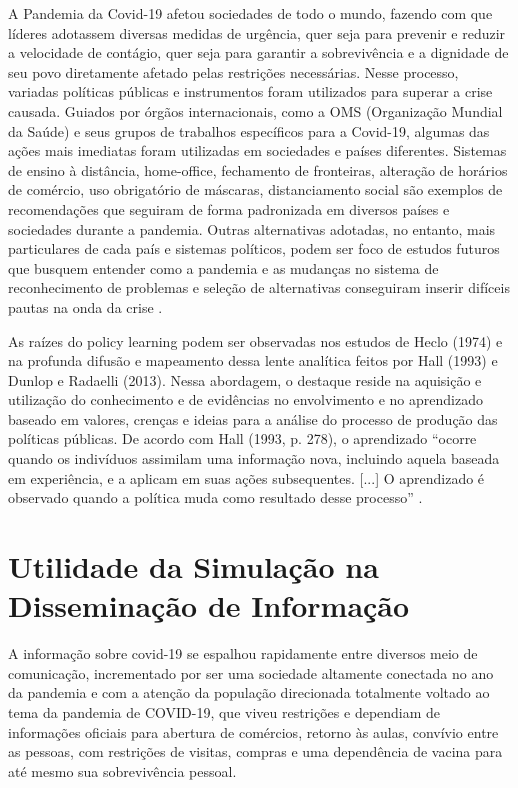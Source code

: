 A Pandemia da Covid-19 afetou sociedades de todo o mundo, fazendo com que líderes adotassem diversas medidas de urgência, quer seja para prevenir e reduzir a velocidade de contágio, quer seja para garantir a sobrevivência e a dignidade de seu povo diretamente afetado pelas restrições necessárias. Nesse processo, variadas políticas públicas e instrumentos foram utilizados para superar a crise causada. Guiados por órgãos internacionais, como a OMS (Organização Mundial da Saúde) e seus grupos de trabalhos específicos para a Covid-19, algumas das ações mais imediatas foram utilizadas em sociedades e países diferentes. Sistemas de ensino à distância, home-office, fechamento de fronteiras, alteração de horários de comércio, uso obrigatório de máscaras, distanciamento social são exemplos de recomendações que seguiram de forma padronizada em diversos países e sociedades durante a pandemia. Outras alternativas adotadas, no entanto, mais particulares de cada país e sistemas políticos, podem ser foco de estudos futuros que busquem entender como a pandemia e as mudanças no sistema de reconhecimento de problemas e seleção de alternativas conseguiram inserir difíceis pautas na onda da crise \cite{brasil2020estudos}.

As raízes do policy learning podem ser observadas nos estudos de Heclo (1974) e na profunda difusão e mapeamento dessa lente analítica feitos por Hall (1993) e Dunlop e Radaelli (2013). Nessa abordagem, o destaque reside na aquisição e utilização do conhecimento e de evidências no envolvimento e no aprendizado baseado em valores, crenças e ideias para a análise do processo de produção das políticas públicas. De acordo com Hall (1993, p. 278), o aprendizado “ocorre quando os indivíduos assimilam uma informação nova, incluindo aquela
baseada em experiência, e a aplicam em suas ações subsequentes. [...] O aprendizado é observado quando a política muda como resultado desse processo” \cite{brasil2020estudos}.

\section{Utilidade da Simulação na Disseminação de Informação}

A informação sobre covid-19 se espalhou rapidamente entre diversos meio de comunicação, incrementado por ser uma sociedade altamente conectada no ano da pandemia e com a atenção da população direcionada totalmente voltado ao tema da pandemia de COVID-19, que viveu restrições e dependiam de informações oficiais para abertura de comércios, retorno às aulas, convívio entre as pessoas, com restrições de visitas, compras e uma dependência de vacina para até mesmo sua sobrevivência pessoal.

